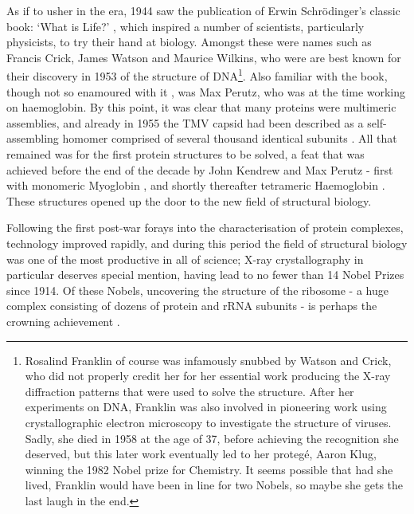 \documentclass[a4paper,11pt,twoside,openright]{scrbook}
\begin{document}
As if to usher in the era, 1944 saw the publication of Erwin Schrödinger's classic book: `What is Life?' \cite{Schrodinger1947}, which inspired a number of scientists, particularly physicists, to try their hand at biology. Amongst these were names such as Francis Crick, James Watson and Maurice Wilkins, who were are best known for their discovery in 1953 of the structure of DNA\footnote{Rosalind Franklin of course was infamously snubbed by Watson and Crick, who did not properly credit her for her essential work producing the X-ray diffraction patterns that were used to solve the structure. After her experiments on DNA, Franklin was also involved in pioneering work using crystallographic electron microscopy to investigate the structure of viruses. Sadly, she died in 1958 at the age of 37, before achieving the recognition she deserved, but this later work eventually led to her proteg{\'e},  Aaron Klug, winning the 1982 Nobel prize for Chemistry. It seems possible that had she lived, Franklin would have been in line for two Nobels, so maybe she gets the last laugh in the end.}. Also familiar with the book, though not so enamoured with it \cite{Dronamraju1999}, was Max Perutz, who was at the time working on haemoglobin. By this point, it was clear that many proteins were multimeric assemblies, and already in 1955 the TMV capsid had been described as a self-assembling homomer comprised of several thousand identical subunits \cite{Fraenkel-Conrat1955}. All that remained was for the first protein structures to be solved, a feat that was achieved before the end of the decade by John Kendrew and Max Perutz - first with monomeric Myoglobin \cite{Kendrew1958}, and shortly thereafter tetrameric Haemoglobin \cite{Perutz1960}. These structures opened up the door to the new field of structural biology.

Following the first post-war forays into the characterisation of protein complexes, technology improved rapidly, and during this period the field of structural biology was one of the most productive in all of science; X-ray crystallography in particular deserves special mention, having lead to no fewer than 14 Nobel Prizes since 1914. Of these Nobels, uncovering the structure of the ribosome - a huge complex consisting of dozens of protein and rRNA subunits - is perhaps the crowning achievement \cite{Schluenzen2000,Ramakrishnan2000,Ban2000}.
\end{document}
